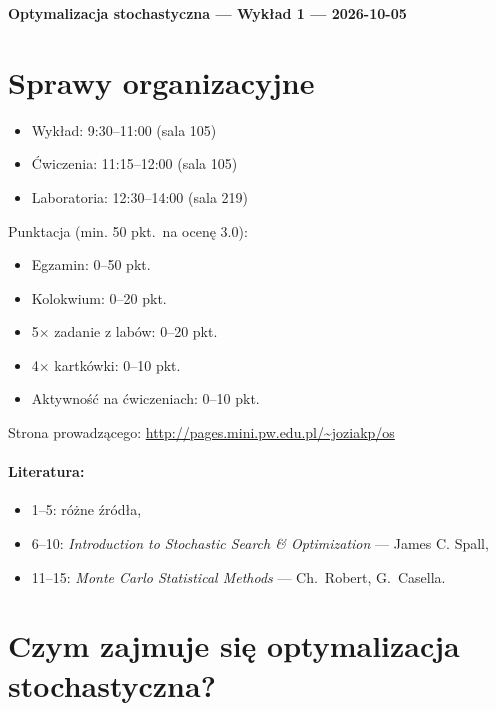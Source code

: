 \documentclass[dvipsnames]{book}
\begin{document}
\begin{center}
  {\Large\bfseries Optymalizacja stochastyczna --- Wykład 1 --- 2026-10-05}
\end{center}

\section*{Sprawy organizacyjne}

\begin{itemize}[topsep=0pt,itemsep=0pt]
  \item Wykład: 9:30--11:00 \quad (sala 105)
  \item Ćwiczenia: 11:15--12:00 \quad (sala 105)
  \item Laboratoria: 12:30--14:00 \quad (sala 219)
\end{itemize}

Punktacja (min. 50 pkt.\ na ocenę 3.0):
\begin{itemize}[topsep=0pt,itemsep=0pt]
  \item Egzamin: 0--50 pkt.
  \item Kolokwium: 0--20 pkt.
  \item 5$\times$ zadanie z labów: 0--20 pkt.
  \item 4$\times$ kartkówki: 0--10 pkt.
  \item Aktywność na ćwiczeniach: 0--10 pkt.
\end{itemize}

Strona prowadzącego:
\url{http://pages.mini.pw.edu.pl/~joziakp/os}

\paragraph{Literatura:}
\begin{itemize}[topsep=0pt,itemsep=0pt]
  \item 1--5: różne źródła,
  \item 6--10: \emph{Introduction to Stochastic Search \& Optimization} --- James C. Spall,
  \item 11--15: \emph{Monte Carlo Statistical Methods} --- Ch.\ Robert, G.\ Casella.
\end{itemize}

\hrulefill

\section*{Czym zajmuje się optymalizacja stochastyczna?}
\end{document}
